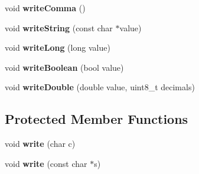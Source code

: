 \begin{DoxyCompactItemize}
\item 
\hypertarget{class_arduino_json_1_1_internals_1_1_json_writer_a17d14e25639f61f9b8114dae8c5c9ab8}{}void {\bfseries write\+Comma} ()\label{class_arduino_json_1_1_internals_1_1_json_writer_a17d14e25639f61f9b8114dae8c5c9ab8}

\item 
\hypertarget{class_arduino_json_1_1_internals_1_1_json_writer_a67e8a339758de2e46a14bf6e00b21a73}{}void {\bfseries write\+String} (const char $\ast$value)\label{class_arduino_json_1_1_internals_1_1_json_writer_a67e8a339758de2e46a14bf6e00b21a73}

\item 
\hypertarget{class_arduino_json_1_1_internals_1_1_json_writer_aeb182995643bb087558316df87c24884}{}void {\bfseries write\+Long} (long value)\label{class_arduino_json_1_1_internals_1_1_json_writer_aeb182995643bb087558316df87c24884}

\item 
\hypertarget{class_arduino_json_1_1_internals_1_1_json_writer_a25cbf2177aaedf05d046194ab812bc05}{}void {\bfseries write\+Boolean} (bool value)\label{class_arduino_json_1_1_internals_1_1_json_writer_a25cbf2177aaedf05d046194ab812bc05}

\item 
\hypertarget{class_arduino_json_1_1_internals_1_1_json_writer_aecefdc2de9bfc49c960281c1c1b76121}{}void {\bfseries write\+Double} (double value, uint8\+\_\+t decimals)\label{class_arduino_json_1_1_internals_1_1_json_writer_aecefdc2de9bfc49c960281c1c1b76121}

\end{DoxyCompactItemize}
\subsection*{Protected Member Functions}
\begin{DoxyCompactItemize}
\item 
\hypertarget{class_arduino_json_1_1_internals_1_1_json_writer_a83b6cb4e48bc74e6dc8db25df0e393c0}{}void {\bfseries write} (char c)\label{class_arduino_json_1_1_internals_1_1_json_writer_a83b6cb4e48bc74e6dc8db25df0e393c0}

\item 
\hypertarget{class_arduino_json_1_1_internals_1_1_json_writer_aa2757d66f17cddb66f27447c5c283fb3}{}void {\bfseries write} (const char $\ast$s)\label{class_arduino_json_1_1_internals_1_1_json_writer_aa2757d66f17cddb66f27447c5c283fb3}

\end{DoxyCompactItemize}
